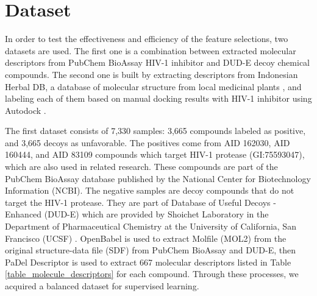 \documentclass[conference]{IEEEtran}
\begin{document}
\section{Dataset} \label{Dataset}

In order to test the effectiveness and efficiency of the feature selections, two datasets are used. The first one is a combination between extracted molecular descriptors from PubChem BioAssay HIV-1 inhibitor \cite{bioassay2014update} and DUD-E decoy chemical compounds\cite{mysinger2012directory}. The second one is built by extracting descriptors from Indonesian Herbal DB, a database of molecular structure from local medicinal plants \cite{yanuar2011medicinal}, and labeling each of them based on manual docking results with HIV-1 inhibitor using Autodock \cite{morris2009autodock4}.  

The first dataset consists of 7,330 samples: 3,665 compounds labeled as positive, and 3,665 decoys as unfavorable. The positives come from AID 162030, AID 160444, and AID 83109 compounds which target HIV-1 protease (GI:75593047), which are also used in related research\cite{yanuar2014virtual}. These compounds are part of the PubChem BioAssay database published by the National Center for Biotechnology Information (NCBI). The negative samples are decoy compounds that do not target the HIV-1 protease. They are part of Database of Useful Decoys - Enhanced (DUD-E) which are provided by Shoichet Laboratory in the Department of Pharmaceutical Chemistry at the University of California, San Francisco (UCSF) \cite{mysinger2012directory}. OpenBabel\cite{o2011open} is used to extract Molfile (MOL2) from the original structure-data file (SDF) from PubChem BioAssay and DUD-E, then PaDel Descriptor\cite{yap2011padel} is used to extract 667 molecular descriptors listed in Table \ref{table_molecule_descriptors} for each compound. Through these processes, we acquired a balanced dataset for supervised learning.
\end{document}
